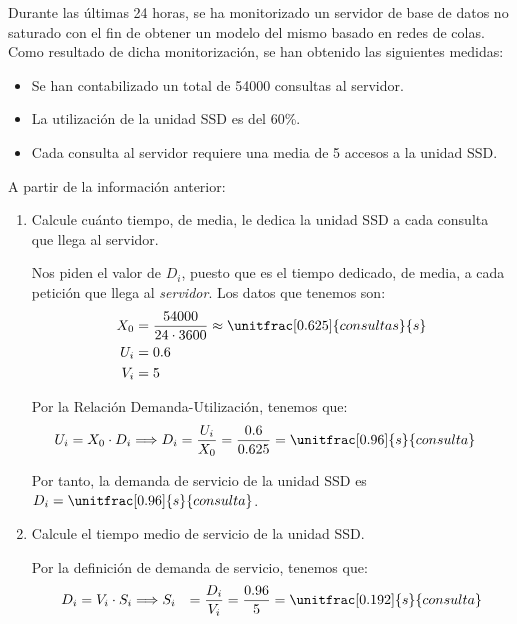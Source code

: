 \begin{ejercicio}\label{ej:5.30}
    Durante las últimas 24 horas, se ha monitorizado un servidor de base de datos no saturado con el fin de obtener un modelo del mismo basado en redes de colas. Como resultado de dicha monitorización, se han obtenido las siguientes medidas:
    \begin{itemize}
        \item Se han contabilizado un total de 54000 consultas al servidor.
        \item La utilización de la unidad SSD es del 60\%.
        \item Cada consulta al servidor requiere una media de 5 accesos a la unidad SSD.
    \end{itemize}
    A partir de la información anterior:
    \begin{enumerate}
        \item Calcule cuánto tiempo, de media, le dedica la unidad SSD a cada consulta que llega al servidor.
        

        Nos piden el valor de $D_i$, puesto que es el tiempo dedicado, de media, a cada petición que llega al \emph{servidor}. Los datos que tenemos son:
        \begin{align*}
            X_0 &= \dfrac{54000}{24 \cdot 3600} \approx \unitfrac[0.625]{consultas}{s}\\
            U_i &= 0.6 \\
            V_i &= 5
        \end{align*}

        Por la Relación Demanda-Utilización, tenemos que:
        \begin{align*}
            U_i = X_0 \cdot D_i
            \Longrightarrow D_i &= \dfrac{U_i}{X_0} = \dfrac{0.6}{0.625} = \unitfrac[0.96]{s}{consulta}
        \end{align*}

        Por tanto, la demanda de servicio de la unidad SSD es $D_{i} = \unitfrac[0.96]{s}{consulta}$.

        
        \item Calcule el tiempo medio de servicio de la unidad SSD.
        
        Por la definición de demanda de servicio, tenemos que:
        \begin{align*}
            D_i &= V_i \cdot S_i
            \Longrightarrow S_i &= \dfrac{D_i}{V_i} = \dfrac{0.96}{5} = \unitfrac[0.192]{s}{consulta}
        \end{align*}
    \end{enumerate}
\end{ejercicio}
\begin{comment}
\solucion
    \begin{enumerate}
        \item La demanda de servicio de la unidad SSD es $D_{ssd} = 0.96$ s (nos piden la demanda de servicio).
        \item El tiempo medio de servicio de la unidad SSD es $S_{ssd} = 0.192$ s.
    \end{enumerate}
\end{comment}

